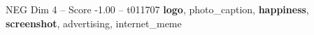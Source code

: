 \begin{textsample}{NEG Dim 4 – Score -1.00 – t011707}  \label{ex:f4_neg_024}
\textbf{logo}, photo\_caption, \textbf{happiness}, \textbf{screenshot}, advertising, internet\_meme

\end{textsample}
